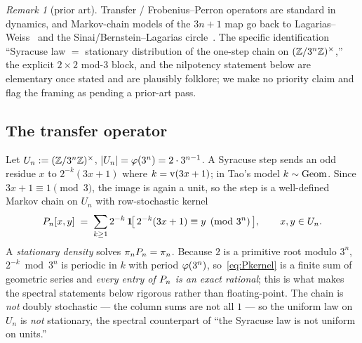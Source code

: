\documentclass[11pt]{amsart}
\theoremstyle{definition}
\theoremstyle{remark}
\newtheorem{remark}[theorem]{Remark}
\begin{document}
\begin{remark}[prior art]\label{rem:transfer-priorart}
Transfer / Frobenius--Perron operators are standard in dynamics, and Markov-chain models of the
$3n+1$ map go back to Lagarias--Weiss~\citep{lagariasweiss1992} and the Sinai/Bernstein--Lagarias
circle~\citep{sinai2003,bernsteinlagarias1996}. The specific identification ``Syracuse law
$=$ stationary distribution of the one-step chain on $(\mathbb{Z}/3^{n}\mathbb{Z})^{\times}$,'' the explicit $2\times2$
mod-$3$ block, and the nilpotency statement below are elementary once stated and are plausibly
folklore; we make no priority claim and flag the framing as pending a prior-art pass.
\end{remark}

\subsection{The transfer operator}
Let $U_n:=(\mathbb{Z}/3^{n}\mathbb{Z})^{\times}$, $|U_n|=\varphi(3^n)=2\cdot3^{n-1}$. A Syracuse step sends an odd residue $x$ to
$2^{-k}(3x+1)$ where $k=\operatorname{v}(3x+1)$; in Tao's model $k\sim\operatorname{Geom}$. Since $3x+1\equiv1\pmod3$, the
image is again a unit, so the step is a well-defined Markov chain on $U_n$ with row-stochastic
kernel
\begin{equation}
   P_n[x,y]\;=\;\sum_{k\ge1}2^{-k}\,\mathbf{1}\!\big[\,2^{-k}(3x+1)\equiv y \pmod{3^n}\,\big],
   \qquad x,y\in U_n.
   \label{eq:Pkernel}
\end{equation}
A \emph{stationary density} solves $\pi_nP_n=\pi_n$. Because $2$ is a primitive root modulo
$3^n$, $2^{-k}\bmod 3^n$ is periodic in $k$ with period $\varphi(3^n)$, so~\eqref{eq:Pkernel} is a finite
sum of geometric series and \emph{every entry of $P_n$ is an exact rational}; this is what makes
the spectral statements below rigorous rather than floating-point. The chain is \emph{not} doubly
stochastic --- the column sums are not all $1$ --- so the uniform law on $U_n$ is \emph{not}
stationary, the spectral counterpart of ``the Syracuse law is not uniform on units.''
\end{document}

